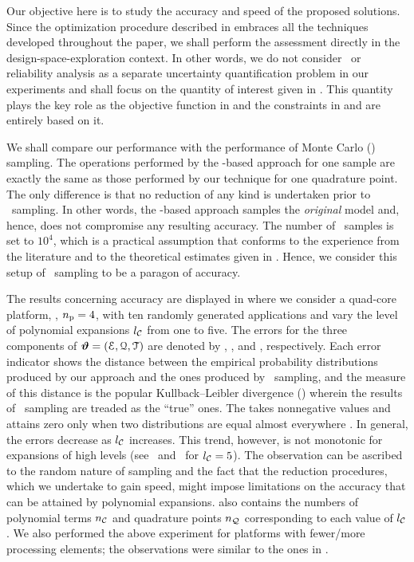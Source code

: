 Our objective here is to study the accuracy and speed of the proposed solutions.
Since the optimization procedure described in  embraces all the techniques developed throughout the paper, we shall perform the assessment directly in the design-space-exploration context.
In other words, we do not consider \ta\ or reliability analysis as a separate uncertainty quantification problem in our experiments and shall focus on the quantity of interest given in .
This quantity plays the key role as the objective function in  and the constraints in  and  are entirely based on it.

We shall compare our performance with the performance of Monte Carlo (\MC) sampling.
The operations performed by the \MC-based approach for one sample are exactly the same as those performed by our technique for one quadrature point.
The only difference is that no reduction of any kind is undertaken prior to \MC\ sampling.
In other words, the \MC-based approach samples the \emph{original} model and, hence, does not compromise any resulting accuracy.
The number of \MC\ samples is set to $10^4$, which is a practical assumption that conforms to the experience from the literature \cite{ukhov2014, lee2013, juan2012, xiang2010} and to the theoretical estimates given in \cite{diaz-emparanza2002}.
Hence, we consider this setup of \MC\ sampling to be a paragon of accuracy.


The results concerning accuracy are displayed in  where we consider a quad-core platform, \ie, ${n_\text{p}} = 4$, with ten randomly generated applications and vary the level of polynomial expansions ${l_\mathcal{C}}$ from one to five.
The errors for the three components of $\bm{\vartheta} = (\EuScript{E}, \EuScript{Q}, \EuScript{T})$ are denoted by \errorE, \errorQ, and \errorT, respectively.
Each error indicator shows the distance between the empirical probability distributions produced by our approach and the ones produced by \MC\ sampling, and the measure of this distance is the popular Kullback--Leibler divergence () wherein the results of \MC\ sampling are treaded as the ``true'' ones.
The  takes nonnegative values and attains zero only when two distributions are equal almost everywhere \cite{durrett2010}.
In general, the errors decrease as ${l_\mathcal{C}}$ increases.
This trend, however, is not monotonic for expansions of high levels (see \errorQ\ and \errorT\ for ${l_\mathcal{C}} = 5$).
The observation can be ascribed to the random nature of sampling and the fact that the reduction procedures, which we undertake to gain speed, might impose limitations on the accuracy that can be attained by polynomial expansions.
 also contains the numbers of polynomial terms ${n_\mathcal{C}}$ and quadrature points ${n_\mathcal{Q}}$ corresponding to each value of ${l_\mathcal{C}}$.
We also performed the above experiment for platforms with fewer/more processing elements; the observations were similar to the ones in .


